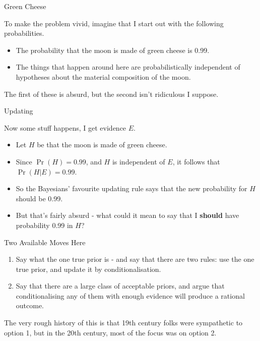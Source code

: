 \documentclass[
  ignorenonframetext,
]{beamer}
\providecommand{\tightlist}{%
  \setlength{\itemsep}{0pt}\setlength{\parskip}{0pt}}
\renewcommand{\,}{\text{, }}
\begin{document}
\begin{frame}{Green Cheese}
\protect\hypertarget{green-cheese-1}{}

To make the problem vivid, imagine that I start out with the following
probabilities.

\begin{itemize}
\tightlist
\item
  The probability that the moon is made of green cheese is 0.99.
\item
  The things that happen around here are probabilistically independent
  of hypotheses about the material composition of the moon.
\end{itemize}

The first of these is absurd, but the second isn't ridiculous I suppose.

\end{frame}

\begin{frame}{Updating}
\protect\hypertarget{updating-2}{}

Now some stuff happens, I get evidence \(E\).

\begin{itemize}
\tightlist
\item
  Let \(H\) be that the moon is made of green cheese.
\item
  Since \(\Pr(H) = 0.99\), and \(H\) is independent of \(E\), it follows
  that \(\Pr(H | E) = 0.99\). \pause
\item
  So the Bayesians' favourite updating rule says that the new
  probability for \(H\) should be 0.99. \pause
\item
  But that's fairly absurd - what could it mean to say that I
  \textbf{should} have probability 0.99 in \(H\)?
\end{itemize}

\end{frame}

\begin{frame}{Two Available Moves Here}
\protect\hypertarget{two-available-moves-here-1}{}

\begin{enumerate}
\tightlist
\item
  Say what the one true prior is - and say that there are two rules: use
  the one true prior, and update it by conditionalisation. \pause
\item
  Say that there are a large class of acceptable priors, and argue that
  conditionalising any of them with enough evidence will produce a
  rational outcome. \pause
\end{enumerate}

The very rough history of this is that 19th century folks were
sympathetic to option 1, but in the 20th century, most of the focus was
on option 2.

\end{frame}
\end{document}
